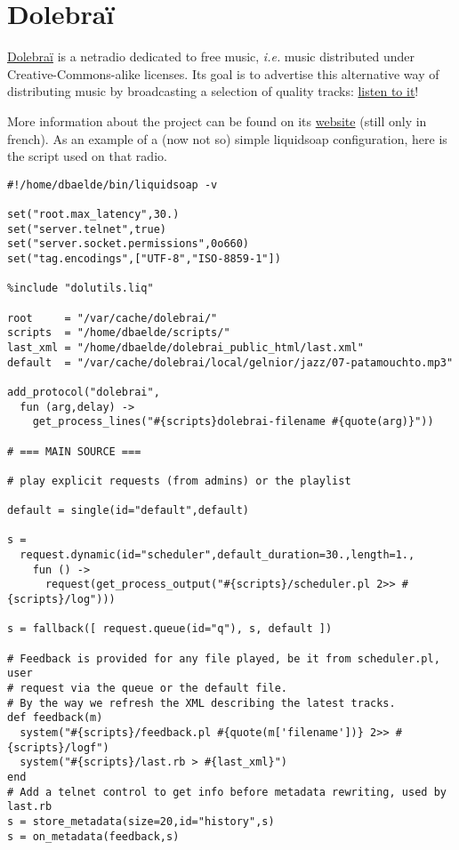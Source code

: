 \section{Dolebraï}
\href{http://dolebrai.net}{Dolebraï} is a netradio dedicated to free music,
\emph{i.e.} music distributed under Creative-Commons-alike licenses.
Its goal is to advertise this alternative way of distributing music
by broadcasting a selection of quality tracks:
\href{http://dolebrai.net:8000/dolebrai.ogg}{listen to it}!

More information about the project can be found on its
\href{http://dolebrai.net}{website} (still only in french).
As an example of a (now not so) simple liquidsoap configuration,
here is the script used on that radio.

\begin{verbatim}
#!/home/dbaelde/bin/liquidsoap -v

set("root.max_latency",30.)
set("server.telnet",true)
set("server.socket.permissions",0o660)
set("tag.encodings",["UTF-8","ISO-8859-1"])

%include "dolutils.liq"

root     = "/var/cache/dolebrai/"
scripts  = "/home/dbaelde/scripts/"
last_xml = "/home/dbaelde/dolebrai_public_html/last.xml"
default  = "/var/cache/dolebrai/local/gelnior/jazz/07-patamouchto.mp3"

add_protocol("dolebrai",
  fun (arg,delay) ->
    get_process_lines("#{scripts}dolebrai-filename #{quote(arg)}"))

# === MAIN SOURCE ===

# play explicit requests (from admins) or the playlist

default = single(id="default",default)

s =
  request.dynamic(id="scheduler",default_duration=30.,length=1.,
    fun () ->
      request(get_process_output("#{scripts}/scheduler.pl 2>> #{scripts}/log")))

s = fallback([ request.queue(id="q"), s, default ])

# Feedback is provided for any file played, be it from scheduler.pl, user 
# request via the queue or the default file.
# By the way we refresh the XML describing the latest tracks.
def feedback(m)
  system("#{scripts}/feedback.pl #{quote(m['filename'])} 2>> #{scripts}/logf")
  system("#{scripts}/last.rb > #{last_xml}")
end
# Add a telnet control to get info before metadata rewriting, used by last.rb
s = store_metadata(size=20,id="history",s)
s = on_metadata(feedback,s)


\end{verbatim}
